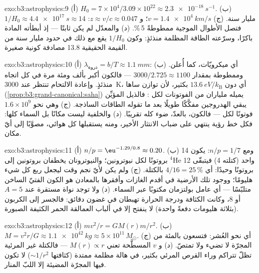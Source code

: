 \begin{solution}{exo:b3:astrophysics:9}
(أ) $H_0 = 7\times10^4/3.09\times10^{22} \approx
\qty{2.3e-18}{s^{-1}}$. (ب) $1/H_0 \approx \qty{4.4e17}{s}
\approx 14$ مليار سنة. (ج) $v = \qty{1.4e4}{km/s}$؛ و
$z \approx v/c \approx 0.047$: فتصل الأطوال الموجية ممطوطةً
5\,\%. (د) والمعدّل لم يكن ثابتًا --- إذ أبطأته
المادة باكرًا، وسرّعته الطاقة المظلمة منذئذٍ: وكون
$1/H_0$ يقع مع ذلك في حدود مليار سنة من القيمة الحقيقية 13.8 مصادفة
كونية صغيرة.
\end{solution}

\begin{solution}{exo:b3:astrophysics:10}
(أ) $\lambda_{\text{ذروة}} = b/T \approx \qty{1.1}{mm}$:
أي ميكرويّات، كما أُعلن. (ب) وممطوطة بمقدار $3000/2.725 \approx
1100$ --- فالكون أكبر بألف ومئة مرة في كل
اتجاه منذئذٍ. وإعادة الالتحام تنتظر عند \qty{3000}{K}، أي دون
$\qty{13.6}{eV}/k_{\text{B}}$ بكثير، لأن توازن ساها
(\cref{prop:b3:grand-canonical:saha}) يميله ملياران من
الفوتونات لكل : فالذيل المؤيِّن يبقي الهدروجين مفكَّكًا
طويلًا بعد ما تقوله الطاقات الساذجة. (ج) وهي نحو
$1.6\times10^{9}$ فوتونًا لكل  --- فالكون، بالعدّ،
ضوء كله تقريبًا. (د) والخلفية ليست مكانًا بل
السماء كلها: فكل خط رؤية ينتهي على ضباب الانتثار
الأخير، ومنه يستقبلها كل هوائي، مصوَّبًا إلى أيّ مكان.
\end{solution}

\begin{solution}{exo:b3:astrophysics:11}
(أ) $n/p = \eu^{-1.29/0.8} \approx 0.20$. (ب) ومع $n/p = 1/7$:
يكون 14 بروتونًا لكل نيوترونين؛ والنيوترونان يخطفان بروتونين إلى
$^4$He واحد (كتلته 4) فيتبقّى 12 بروتونًا وحيدًا: أي $4/16 = 25\,\%$
بالكتلة. (ج) ولم يكن لأيّ نجم وقت ليجعل ربع كل شيء
هليومًا؛ ووجود تلك الأرضية في أقدم الغازات وأفقرها بالمعادن
هو الكون الفتيّ الساخن متلبّسًا --- أي عامل بولتزمان
مكتوبًا عبر السماء. (د) ولا توجد نواة مستقرة
عند $A = 5$ أو $8$، وكانت الكثافة ودرجة الحرارة
تهبطان في غضون دقائق: فالجسر إلى الكربون (بثلاثة هليومات
دفعةً واحدة) لا ينفتح إلا في ألباب العمالقة الحمر الكثيفة الصبورة.
\end{solution}

\begin{solution}{exo:b3:astrophysics:12}
(أ) $mv^2/r = GM(r)m/r^2$. (ب) $M = v^2r/G \approx
\qty{1.1e42}{kg} \approx 5\times10^{11}\,M_\odot$. (ج) أي نحو
العُشر: فتسعون بالمئة من المجرّة لا تضيء ولا
تمتصّ. (د) و $v$ المسطَّحة تعني $M(r) \propto r$ --- فالكتلة
غير المرئية تظلّ تتراكم وراء القرص المرئي بكثير، في هالة
مظلمة ممتدة (كثافتها $\sim1/r^2$) لا تكون فيها المجرّة
المضيئة إلا اللبّ المنار.
\end{solution}


